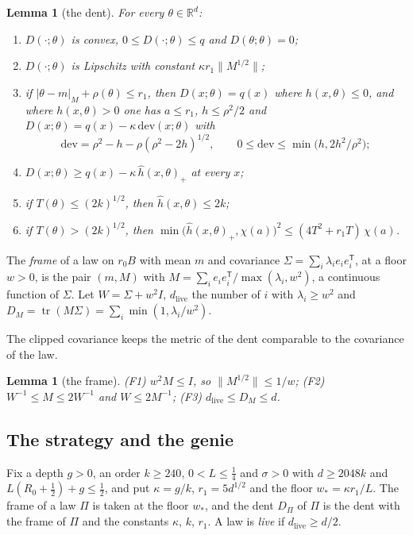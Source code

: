 \documentclass[11pt]{amsart}
\newtheorem{lemma}[theorem]{Lemma}
\theoremstyle{definition}
\numberwithin{equation}{section}
\newcommand{\R}{\mathbb{R}}
\newcommand{\tr}{\operatorname{tr}}
\begin{document}
\begin{lemma}[the dent]\label{lem:dent}
For every $\theta\in\R^d$:
\begin{enumerate}[label=(\alph*)]
\item $D(\cdot;\theta)$ is convex, $0\le D(\cdot;\theta)\le q$ and $D(\theta;\theta)=0$;
\item $D(\cdot;\theta)$ is Lipschitz with constant $\kappa r_1\|M^{1/2}\|$;
\item if $|\theta-m|_M+\rho(\theta)\le r_1$, then $D(x;\theta)=q(x)$ where $h(x,\theta)\le0$, and where $h(x,\theta)>0$ one has $a\le r_1$, $h\le\rho^2/2$ and $D(x;\theta)=q(x)-\kappa\,\mathrm{dev}(x;\theta)$ with
\[
\mathrm{dev}=\rho^2-h-\rho(\rho^2-2h)^{1/2},\qquad0\le\mathrm{dev}\le\min\bigl(h,2h^2/\rho^2\bigr);
\]
\item $D(x;\theta)\ge q(x)-\kappa\,\hat h(x,\theta)_+$ at every $x$;
\item if $T(\theta)\le(2k)^{1/2}$, then $\hat h(x,\theta)\le2k$;
\item if $T(\theta)>(2k)^{1/2}$, then $\min\bigl(\hat h(x,\theta)_+,\chi(a)\bigr)^2\le(4T^2+r_1T)\,\chi(a)$.
\end{enumerate}
\end{lemma}

The \emph{frame} of a law on $r_0B$ with mean $m$ and covariance $\Sigma=\sum_i\lambda_ie_ie_i^{\mathsf T}$, at a floor $w>0$, is the pair $(m,M)$ with $M=\sum_ie_ie_i^{\mathsf T}/\max(\lambda_i,w^2)$, a continuous function of $\Sigma$. Let $W=\Sigma+w^2I$, $d_{\mathrm{live}}$ the number of $i$ with $\lambda_i\ge w^2$ and $D_M=\tr(M\Sigma)=\sum_i\min(1,\lambda_i/w^2)$.

The clipped covariance keeps the metric of the dent comparable to the covariance of the law.

\begin{lemma}[the frame]\label{lem:frame}
(F1) $w^2M\le I$, so $\|M^{1/2}\|\le1/w$; (F2) $W^{-1}\le M\le2W^{-1}$ and $W\le2M^{-1}$; (F3) $d_{\mathrm{live}}\le D_M\le d$.
\end{lemma}

\subsection{The strategy and the genie}\label{sec:lower-strategy}

Fix a depth $g>0$, an order $k\ge240$, $0<L\le\frac14$ and $\sigma>0$ with $d\ge2048k$ and $L(R_0+\frac12)+g\le\frac12$, and put $\kappa=g/k$, $r_1=5d^{1/2}$ and the floor $w_*=\kappa r_1/L$. The frame of a law $\Pi$ is taken at the floor $w_*$, and the dent $D_\Pi$ of $\Pi$ is the dent with the frame of $\Pi$ and the constants $\kappa$, $k$, $r_1$. A law is \emph{live} if $d_{\mathrm{live}}\ge d/2$.
\end{document}
